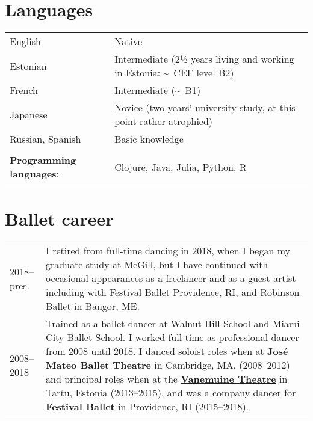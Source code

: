 \documentclass[11pt,a4paper]{article}
\begin{document}
  \section{Languages}

  \begin{longtable}[l]{ll}
    English
    &%
      Native\\
    Estonian 
    &%
      Intermediate (2½ years living and working in Estonia:
      \textasciitilde\ CEF level B2)\\
    French 
    &%
      Intermediate (\textasciitilde\ B1)\\
    Japanese
    &%
      Novice (two years' university study, at this point rather atrophied)\\
    Russian, Spanish%
    &%
      Basic knowledge\\
    \multicolumn{2}{c}{}\\
    \textbf{Programming languages}:
    &%
      Clojure, Java, Julia, Python, R
  \end{longtable}

  \section{Ballet career}
  \begin{longtable}{p{1.7cm}|p{15cm}}
    2018--pres.
    &%
      I retired from full-time dancing in 2018, when I began my graduate study
      at McGill, but I have continued with occasional appearances as a
      freelancer and as a guest artist including with Festival Ballet Providence, 
      RI, and Robinson Ballet in Bangor, ME.\\
    \textsc{2008--2018}
    &%
      Trained as a ballet dancer at Walnut Hill School and Miami City Ballet
      School. I worked full-time as professional dancer from 2008 until 2018. I
      danced soloist roles when at \textbf{José Mateo Ballet Theatre} in
      Cambridge, MA, (2008--2012) and principal roles when at the
      \href{http://vanemuine.ee}{\textbf{Vanemuine Theatre}} in Tartu, Estonia
      (2013--2015), and was a company dancer for
      \href{http://festivalballetprovidence.org}{\textbf{Festival Ballet}} in
      Providence, RI (2015--2018).\\
  \end{longtable}

  
\end{document}
